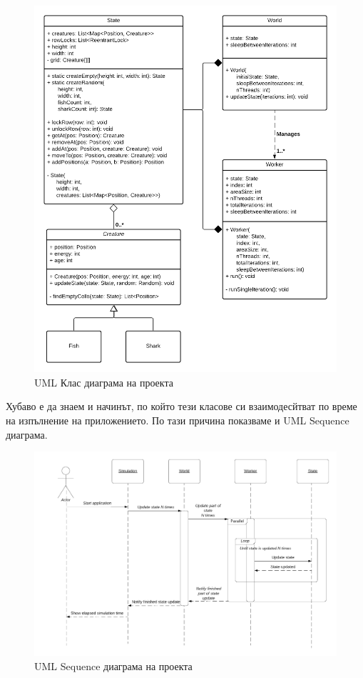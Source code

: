 \documentclass[12pt]{article}
\begin{document}
\begin{figure}[H]
	\centering
	\includegraphics[width=1.2\textwidth]{classes-uml.png}
	\caption{UML Клас диаграма на проекта}
\end{figure}

\newpage

Хубаво е да знаем и начинът, по който тези класове си взаимодесйтват по време на изпълнение на приложението.
По тази причина показваме и UML Sequence диаграма.

\begin{figure}[H]
	\centering
	\includegraphics[width=1\textwidth]{sequence.png}
	\caption{UML Sequence диаграма на проекта}
\end{figure}
\end{document}
